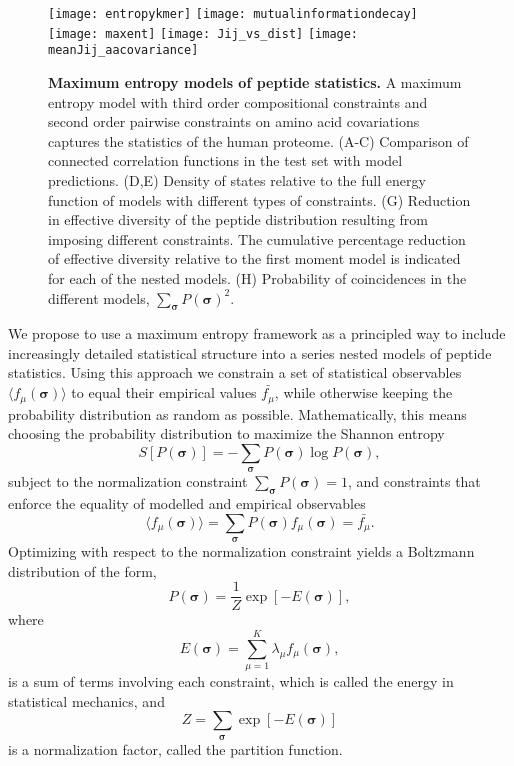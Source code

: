 \documentclass[superscriptaddress,twocolumn,pre]{revtex4}
\newcommand{\B}{\boldsymbol}
\newcommand{\<}{\langle}
\renewcommand{\>}{\rangle}
\begin{document}
 \begin{figure*}
    \texttt{[image: entropykmer]}
    \texttt{[image: mutualinformationdecay]}
    \texttt{[image: maxent]}
    \texttt{[image: Jij\_vs\_dist]}
    \texttt{[image: meanJij\_aacovariance]}
        \caption{{\bf Maximum entropy models of peptide statistics.} A maximum entropy model with third order compositional constraints and second order pairwise constraints on amino acid covariations captures the statistics of the human proteome. (A-C) Comparison of connected correlation functions in the test set with model predictions. (D,E) Density of states relative to the full energy function of models with different types of constraints. (G) Reduction in effective diversity of the peptide distribution resulting from imposing different constraints. The cumulative percentage reduction of effective diversity relative to the first moment model is indicated for each of the nested models. (H) Probability of coincidences in the different models, $\sum_{\B \sigma} P(\B \sigma)^2$.
    \label{figmaxent}
    }
 \end{figure*}

We propose to use a maximum entropy framework as a principled way to include increasingly detailed statistical structure into a series nested models of peptide statistics. Using this approach we constrain a set of statistical observables $\langle f_\mu(\boldsymbol \sigma)\rangle$ to equal their empirical values $\bar{f_\mu}$, while otherwise keeping the probability distribution as random as possible. Mathematically, this means choosing the probability distribution to maximize the Shannon entropy
\begin{equation}
    S[P(\B \sigma)] = - \sum_{\B \sigma} P(\B \sigma) \log P(\B \sigma),
\end{equation}
subject to the normalization constraint $\sum_{\B \sigma} P(\B \sigma) = 1$, and constraints that enforce the equality of modelled and empirical observables
\begin{equation}
    \langle f_\mu(\boldsymbol \sigma)\rangle = \sum_{\boldsymbol \sigma} P(\boldsymbol \sigma) f_\mu(\boldsymbol \sigma) = \bar{f_\mu}.
\end{equation}
Optimizing with respect to the normalization constraint yields a Boltzmann distribution of the form,
\begin{equation}
    P(\boldsymbol \sigma) = \frac{1}{Z} \exp\left[ -E(\B \sigma) \right],
\end{equation}
where
\begin{equation}
 E(\B \sigma) = \sum_{\mu=1}^K \lambda_\mu f_\mu(\boldsymbol \sigma),
\end{equation}
is a sum of terms involving each constraint, which is called the energy in statistical mechanics, and 
\begin{equation}
    Z = \sum_{\B \sigma} \exp \left[ - E(\B \sigma) \right]
\end{equation}
is a normalization factor, called the partition function.
\end{document}
